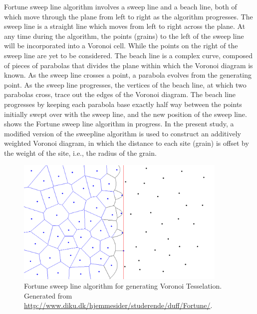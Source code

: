 Fortune sweep line algorithm involves a sweep line and a beach line, both of 
which move through the plane from left to right as the algorithm progresses. 
The sweep line is a straight line which moves from left to right across the 
plane. At any time during the algorithm, the points (grains) to the left of the 
sweep line will be incorporated into a Voronoi cell. While the points on the 
right of the sweep line are yet to be considered. The beach line is a complex 
curve, composed of pieces of parabolas that divides the plane within which the 
Voronoi diagram is known. As the sweep line crosses a point, a parabola 
evolves from the generating point. As the sweep line progresses, the 
vertices of the beach line, at which two parabolas cross, trace out the edges 
of the Voronoi diagram. The beach line progresses by keeping each parabola base 
exactly half way between the points initially swept over with the sweep line, 
and the new position of the sweep line.~ shows the Fortune 
sweep line algorithm in progress. In the present study, a modified version of 
the sweepline algorithm is used to construct an additively weighted Voronoi 
diagram, in which the distance to each site (grain) is offset by the weight of 
the site, i.e., the radius of the grain.

\begin{figure}[tbhp]
\centering
\includegraphics[width=0.9\textwidth]{sweep_voro}
\caption[Fortune sweep line algorithm for generating Voronoi 
Tesselation]{Fortune sweep line algorithm for generating Voronoi Tesselation. 
Generated from \url{http://www.diku.dk/hjemmesider/studerende/duff/Fortune/}.}
\label{fig:sweep_voro}
\end{figure}

